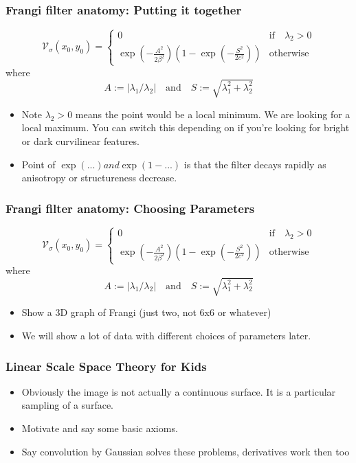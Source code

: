 \documentclass[9pt,notes]{beamer}
\newcommand{\Vsigma}{\ensuremath{\mathcal{V}_{\sigma}}\xspace}
\begin{document}
\begin{frame}
\frametitle{Frangi filter anatomy: Putting it together}
 \begin{equation}
\Vsigma(x_0,y_0) =
\begin{cases}
0 & \text{if} \quad \lambda_2 > 0 \\
\exp\left(-\frac{A^2}{2\beta^2}\right)
\left(1 - \exp\left(-\frac{S^2}{2c^2}\right)\right) & \textrm{otherwise}
\end{cases}
\end{equation}
where
\begin{equation}
A := \left|\lambda_1 / \lambda_2\right|
\quad \textrm{and} \quad 
S := \sqrt{\lambda_1^2 + \lambda_2^2}
\end{equation}
\begin{itemize}
\item Note $\lambda_2 > 0$ means the point would be a local minimum. We are looking for a local maximum. You can switch this depending on if you're looking for bright or dark curvilinear features.
\item Point of $\exp(...) and \exp(1-...)$ is that the filter decays rapidly as anisotropy or structureness decrease.
\end{itemize}
\end{frame}
\begin{frame}
\frametitle[Frangi parameters]{Frangi filter anatomy: Choosing Parameters}
    \begin{equation}
  \Vsigma(x_0,y_0) =
  \begin{cases}
  0 & \text{if} \quad \lambda_2 > 0 \\
  \exp\left(-\frac{A^2}{2\beta^2}\right)
  \left(1 - \exp\left(-\frac{S^2}{2c^2}\right)\right) & \textrm{otherwise}
  \end{cases}
  \end{equation}
  where
  \begin{equation}
  A := \left|\lambda_1 / \lambda_2\right|
  \quad \textrm{and} \quad 
  S := \sqrt{\lambda_1^2 + \lambda_2^2}
  \end{equation}
\begin{itemize}
\item Show a 3D graph of Frangi (just two, not 6x6 or whatever)
\item We will show a lot of data with different choices of parameters later.
\end{itemize}
\end{frame}

\begin{frame}
\frametitle[Scale Space Theory]{Linear Scale Space Theory for Kids}
\begin{itemize}
  \item Obviously the image is not actually a continuous surface. It is a particular sampling of a surface. 
  \item Motivate and say some basic axioms.
  \item Say convolution by Gaussian solves these problems, derivatives work then too
\end{itemize}
\end{frame}
\end{document}
